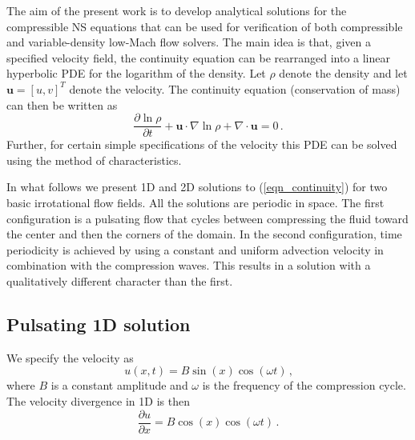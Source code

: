 \documentclass[11pt]{book}
\begin{document}
The aim of the present work is to develop analytical solutions for the compressible NS equations that can be used for verification of both compressible and variable-density low-Mach flow solvers.  The main idea is that, given a specified velocity field, the continuity equation can be rearranged into a linear hyperbolic PDE for the logarithm of the density.  Let $\rho$ denote the density and let $\mathbf{u} = [u,v]^T$ denote the velocity. The continuity equation (conservation of mass) can then be written as
\begin{equation}
\label{eqn_continuity}
\frac{\partial \ln \rho}{\partial t} + \mathbf{u} \cdot \nabla \ln \rho + \nabla\cdot \mathbf{u} = 0 \,\mbox{.}
\end{equation}
Further, for certain simple specifications of the velocity this PDE can be solved using the method of characteristics.

In what follows we present 1D and 2D solutions to (\ref{eqn_continuity}) for two basic irrotational flow fields.  All the solutions are periodic in space.  The first configuration is a pulsating flow that cycles between compressing the fluid toward the center and then the corners of the domain.  In the second configuration, time periodicity is achieved by using a constant and uniform advection velocity in combination with the compression waves.  This results in a solution with a qualitatively different character than the first.

\subsection{Pulsating 1D solution}
\label{soln_1d}

We specify the velocity as
\begin{equation}
\label{eqn_velocity1d}
u(x,t)  = B \sin(x) \cos(\omega t) \,\mbox{,}
\end{equation}
where $B$ is a constant amplitude and $\omega$ is the frequency of the compression cycle. The velocity divergence in 1D is then
\begin{equation}
\label{eqn_pdesource1d}
\frac{\partial u}{\partial x} = B \cos(x) \cos(\omega t) \,\mbox{.}
\end{equation}
\end{document}
